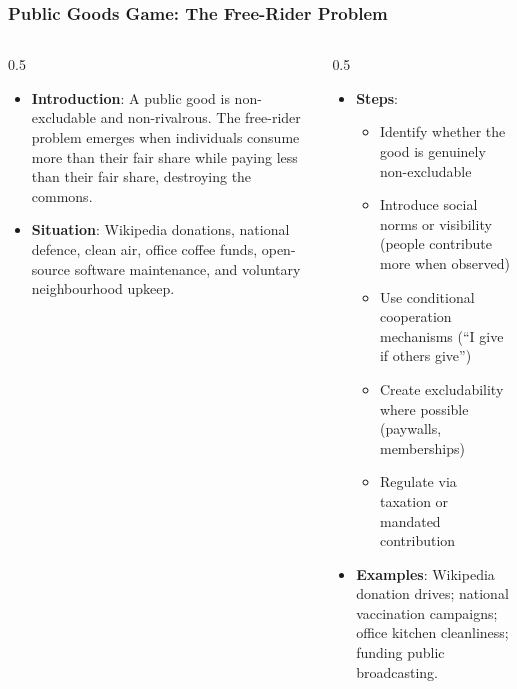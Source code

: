 \begin{frame}[fragile]\frametitle{Public Goods Game: The Free-Rider Problem}
\begin{columns}
    \begin{column}[T]{0.5\linewidth}
      \begin{itemize}
        \item \textbf{Introduction}: A public good is non-excludable and non-rivalrous. The free-rider problem emerges when individuals consume more than their fair share while paying less than their fair share, destroying the commons.
        \item \textbf{Situation}: Wikipedia donations, national defence, clean air, office coffee funds, open-source software maintenance, and voluntary neighbourhood upkeep.
      \end{itemize}
    \end{column}
    \begin{column}[T]{0.5\linewidth}
      \begin{itemize}
        \item \textbf{Steps}:
        \begin{itemize}
          \item Identify whether the good is genuinely non-excludable
          \item Introduce social norms or visibility (people contribute more when observed)
          \item Use conditional cooperation mechanisms (``I give if others give'')
          \item Create excludability where possible (paywalls, memberships)
          \item Regulate via taxation or mandated contribution
        \end{itemize}\item \textbf{Examples}: Wikipedia donation drives; national vaccination campaigns; office kitchen cleanliness; funding public broadcasting.
      \end{itemize}
    \end{column}
  \end{columns}
\end{frame}


